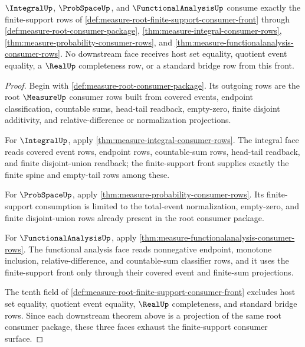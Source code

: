 \begin{theorem}
\label{thm:measure-root-finite-support-downstream-exhaustion}
$\IntegralUp$, $\ProbSpaceUp$, and $\FunctionalAnalysisUp$ consume exactly the
finite-support rows of
\autoref{def:measure-root-finite-support-consumer-front} through
\autoref{def:measure-root-consumer-package},
\autoref{thm:measure-integral-consumer-rows},
\autoref{thm:measure-probability-consumer-rows}, and
\autoref{thm:measure-functionalanalysis-consumer-rows}. No downstream face
receives host set equality, quotient event equality, a $\RealUp$ completeness
row, or a standard bridge row from this front.
\end{theorem}
\begin{proof}
Begin with \autoref{def:measure-root-consumer-package}. Its outgoing rows are
the root $\MeasureUp$ consumer rows built from covered events, endpoint
classification, countable sums, head-tail readback, empty-zero, finite
disjoint additivity, and relative-difference or normalization projections.

For $\IntegralUp$, apply \autoref{thm:measure-integral-consumer-rows}. The
integral face reads covered event rows, endpoint rows, countable-sum rows,
head-tail readback, and finite disjoint-union readback; the finite-support
front supplies exactly the finite spine and empty-tail rows among these.

For $\ProbSpaceUp$, apply \autoref{thm:measure-probability-consumer-rows}. Its
finite-support consumption is limited to the total-event normalization,
empty-zero, and finite disjoint-union rows already present in the root
consumer package.

For $\FunctionalAnalysisUp$, apply
\autoref{thm:measure-functionalanalysis-consumer-rows}. The functional
analysis face reads nonnegative endpoint, monotone inclusion,
relative-difference, and countable-sum classifier rows, and it uses the
finite-support front only through their covered event and finite-sum
projections.

The tenth field of
\autoref{def:measure-root-finite-support-consumer-front} excludes host set
equality, quotient event equality, $\RealUp$ completeness, and standard
bridge rows. Since each downstream theorem above is a projection of the same
root consumer package, these three faces exhaust the finite-support consumer
surface.
\end{proof}
